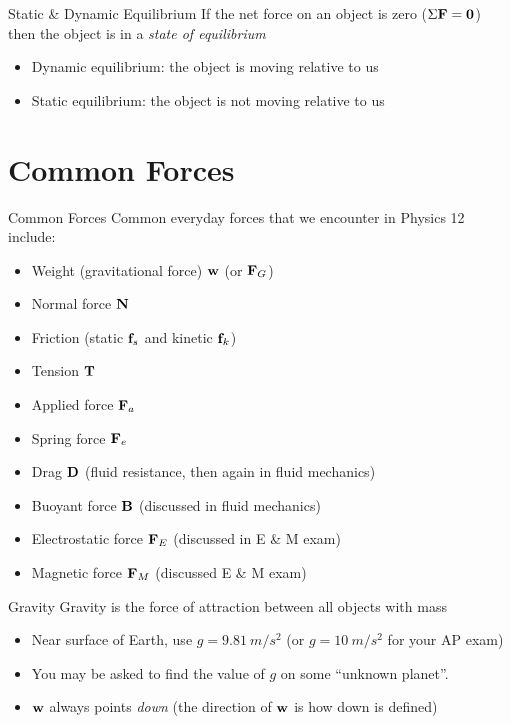 \documentclass[12pt,compress,aspectratio=169]{beamer}
\newcommand{\mb}[1]{\ensuremath\mathbf{#1}}
\newcommand{\eq}[2]{\vspace{#1}{\Large\begin{displaymath}#2\end{displaymath}}}
\begin{document}
\begin{frame}{Static \& Dynamic Equilibrium}
  If the net force on an object is zero ($\Sigma\mb{F}=\mb{0}$) then the
  object is in a \emph{state of equilibrium}
  \begin{itemize}
  \item Dynamic equilibrium: the object is moving relative to us
  \item Static equilibrium: the object is not moving relative to us
  \end{itemize}
\end{frame}


\section{Common Forces}

\begin{frame}{Common Forces}
  Common everyday forces that we encounter in Physics 12 include:
  \begin{itemize}
  \item Weight (gravitational force) $\mb{w}$ (or $\mb{F}_G$)
  \item Normal force $\mb{N}$
  \item Friction (static $\mb{f}_s$ and kinetic $\mb{f}_k$)
  \item Tension $\mb{T}$
  \item Applied force $\mb{F}_a$
  \item Spring force $\mb{F}_e$
  \item Drag $\mb{D}$ (fluid resistance, then again in fluid mechanics)
  \item Buoyant force $\mb{B}$ (discussed in fluid mechanics)
  \item Electrostatic force $\mb{F}_E$ (discussed in E \& M exam)
  \item Magnetic force $\mb{F}_M$ (discussed E \& M exam)
  \end{itemize}
\end{frame}



\begin{frame}{Gravity}
  Gravity is the force of attraction between all objects with mass
    
  \eq{-.2in}{
    \boxed{\mb{w}=m\mb{g}}
  }
  \begin{itemize}
  \item\vspace{-.15in}Near surface of Earth, use $g=\SI{9.81}{m/s^2}$ (or
    $g=\SI{10}{m/s^2}$ for your AP exam)
  \item You may be asked to find the value of $g$ on some ``unknown planet''.
  \item $\mb{w}$ always points \emph{down} (the direction of $\mb{w}$ is how
    down is defined)
%
  \end{itemize}    
\end{frame}
\end{document}
